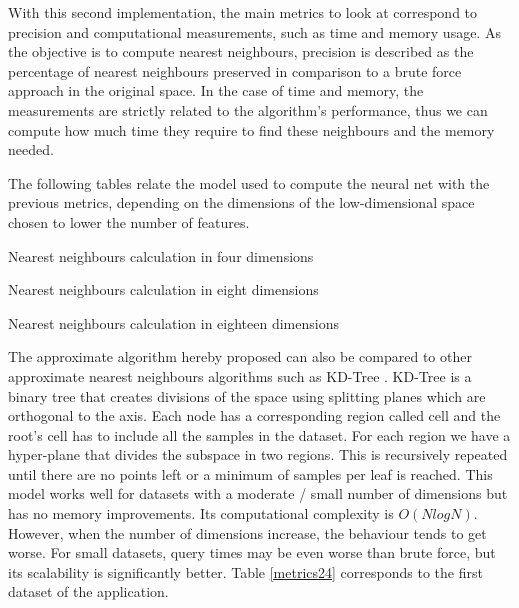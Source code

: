 \documentclass[a4paper,11pt,spanish]{report}
\begin{document}
With this second implementation, the main metrics to look at correspond to precision and computational measurements, such as time and memory usage. As the objective is to compute nearest neighbours, precision is described as the percentage of nearest neighbours preserved in comparison to a brute force approach in the original space. In the case of time and memory, the measurements are strictly related to the algorithm's performance, thus we can compute how much time they require to find these neighbours and the memory needed.

The following tables relate the model used to compute the neural net with the previous metrics, depending on the dimensions of the low-dimensional space chosen to lower the number of features.

\begin{table}[p]
\centering

\caption{\label{metrics21}Nearest neighbours calculation in four dimensions}
\end{table}

\begin{table}[p]
\centering

\caption{\label{metrics22}Nearest neighbours calculation in eight dimensions}
\end{table}

\begin{table}[p]
\centering

\caption{\label{metrics23}Nearest neighbours calculation in eighteen dimensions}
\end{table}

The approximate algorithm hereby proposed can also be compared to other approximate nearest neighbours algorithms such as KD-Tree \citep{kdtree}. KD-Tree is a binary tree that creates divisions of the space using splitting planes which are orthogonal to the axis. Each node has a corresponding region called cell and the root's cell has to include all the samples in the dataset. For each region we have a hyper-plane that divides the subspace in two regions. This is recursively repeated until there are no points left or a minimum of samples per leaf is reached. This model works well for datasets with a moderate / small number of dimensions but has no memory improvements. Its computational complexity is  $O(NlogN)$. However, when the number of dimensions increase, the behaviour tends to get worse. For small datasets, query times may be even worse than brute force, but its scalability is significantly better. Table \ref{metrics24} corresponds to the first dataset of the application.
\end{document}
